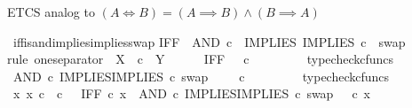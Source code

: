 \begin{isabellebody}
\endisatagproof
{\isafoldproof}%
%
\isadelimproof
%
\endisadelimproof
%
\begin{isamarkuptext}%
ETCS analog to $(A \iff B) = (A \implies B) \land (B \implies A)$%
\end{isamarkuptext}\isamarkuptrue%
\isamarkupfalse%
\ iff{\isacharunderscore}{\kern0pt}is{\isacharunderscore}{\kern0pt}and{\isacharunderscore}{\kern0pt}implies{\isacharunderscore}{\kern0pt}implies{\isacharunderscore}{\kern0pt}swap{\isacharcolon}{\kern0pt}\isanewline
{\isachardoublequoteopen}IFF\ {\isacharequal}{\kern0pt}\ AND\ {\isasymcirc}\isactrlsub c\ \ {\isasymlangle}IMPLIES{\isacharcomma}{\kern0pt}\ IMPLIES\ {\isasymcirc}\isactrlsub c\ \ swap\ {\isasymOmega}\ {\isasymOmega}{\isasymrangle}{\isachardoublequoteclose}\isanewline
%
\isadelimproof
%
\endisadelimproof
%
\isatagproof
{}\isamarkupfalse%
{\isacharparenleft}{\kern0pt}rule\ one{\isacharunderscore}{\kern0pt}separator{\isacharbrackleft}{\kern0pt}\ \ X\ {\isacharequal}{\kern0pt}\ {\isachardoublequoteopen}{\isasymOmega}{\isasymtimes}\isactrlsub c{\isasymOmega}{\isachardoublequoteclose}{\isacharcomma}{\kern0pt}\ \ Y\ {\isacharequal}{\kern0pt}\ {\isachardoublequoteopen}{\isasymOmega}{\isachardoublequoteclose}{\isacharbrackright}{\kern0pt}{\isacharparenright}{\kern0pt}\isanewline
\ \ \isamarkupfalse%
\ {\isachardoublequoteopen}IFF\ {\isacharcolon}{\kern0pt}\ {\isasymOmega}\ {\isasymtimes}\isactrlsub c\ {\isasymOmega}\ {\isasymrightarrow}\ {\isasymOmega}{\isachardoublequoteclose}\isanewline
\ \ \ \ \isamarkupfalse%
\ typecheck{\isacharunderscore}{\kern0pt}cfuncs\isanewline
\ \ \isamarkupfalse%
\ {\isachardoublequoteopen}AND\ {\isasymcirc}\isactrlsub c\ {\isasymlangle}IMPLIES{\isacharcomma}{\kern0pt}IMPLIES\ {\isasymcirc}\isactrlsub c\ swap\ {\isasymOmega}\ {\isasymOmega}{\isasymrangle}\ {\isacharcolon}{\kern0pt}\ {\isasymOmega}\ {\isasymtimes}\isactrlsub c\ {\isasymOmega}\ {\isasymrightarrow}\ {\isasymOmega}{\isachardoublequoteclose}\isanewline
\ \ \ \ \isamarkupfalse%
\ typecheck{\isacharunderscore}{\kern0pt}cfuncs\isanewline
\ \ \isamarkupfalse%
\ {\isachardoublequoteopen}{\isasymAnd}x{\isachardot}{\kern0pt}\ x\ {\isasymin}\isactrlsub c\ {\isasymOmega}\ {\isasymtimes}\isactrlsub c\ {\isasymOmega}\ {\isasymLongrightarrow}\ IFF\ {\isasymcirc}\isactrlsub c\ x\ {\isacharequal}{\kern0pt}\ {\isacharparenleft}{\kern0pt}AND\ {\isasymcirc}\isactrlsub c\ {\isasymlangle}IMPLIES{\isacharcomma}{\kern0pt}IMPLIES\ {\isasymcirc}\isactrlsub c\ swap\ {\isasymOmega}\ {\isasymOmega}{\isasymrangle}{\isacharparenright}{\kern0pt}\ {\isasymcirc}\isactrlsub c\ x{\isachardoublequoteclose}\isanewline

\end{isabellebody}
